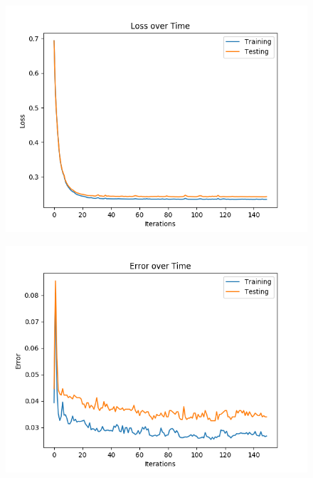 \documentclass{article}
\newcommand{\1}{\mathbf{1}}
\begin{document}
{\begin{figure}[ht]
  \centering
  \includegraphics[width=120mm]{../hw2-code/results/a6_di.png}
\end{figure}

\begin{figure}[h]
  \centering
  \includegraphics[width=120mm]{../hw2-code/results/a6_dii.png}
\end{figure}

}
\end{document}
